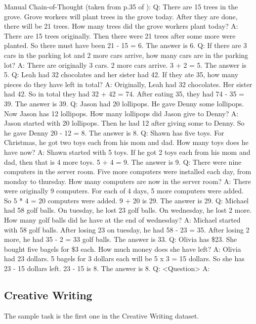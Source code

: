 \documentclass[11pt]{article}
\begin{document}
Manual Chain-of-Thought (taken from p.35 of \citealp{wei_chain--thought_nodate}):
Q: There are 15 trees in the grove. Grove workers will plant trees in the grove today. After they are done, there
will be 21 trees. How many trees did the grove workers plant today?
A: There are 15 trees originally. Then there were 21 trees after some more were planted. So there must have
been 21 - 15 = 6. The answer is 6.
Q: If there are 3 cars in the parking lot and 2 more cars arrive, how many cars are in the parking lot?
A: There are originally 3 cars. 2 more cars arrive. 3 + 2 = 5. The answer is 5.
Q: Leah had 32 chocolates and her sister had 42. If they ate 35, how many pieces do they have left in total?
A: Originally, Leah had 32 chocolates. Her sister had 42. So in total they had 32 + 42 = 74. After eating 35, they
had 74 - 35 = 39. The answer is 39.
Q: Jason had 20 lollipops. He gave Denny some lollipops. Now Jason has 12 lollipops. How many lollipops did
Jason give to Denny?
A: Jason started with 20 lollipops. Then he had 12 after giving some to Denny. So he gave Denny 20 - 12 = 8.
The answer is 8.
Q: Shawn has five toys. For Christmas, he got two toys each from his mom and dad. How many toys does he
have now?
A: Shawn started with 5 toys. If he got 2 toys each from his mom and dad, then that is 4 more toys. 5 + 4 = 9.
The answer is 9.
Q: There were nine computers in the server room. Five more computers were installed each day, from monday
to thursday. How many computers are now in the server room?
A: There were originally 9 computers. For each of 4 days, 5 more computers were added. So 5 * 4 = 20
computers were added. 9 + 20 is 29. The answer is 29.
Q: Michael had 58 golf balls. On tuesday, he lost 23 golf balls. On wednesday, he lost 2 more. How many golf
balls did he have at the end of wednesday?
A: Michael started with 58 golf balls. After losing 23 on tuesday, he had 58 - 23 = 35. After losing 2 more, he
had 35 - 2 = 33 golf balls. The answer is 33.
Q: Olivia has \$23. She bought five bagels for \$3 each. How much money does she have left?
A: Olivia had 23 dollars. 5 bagels for 3 dollars each will be 5 x 3 = 15 dollars. So she has 23 - 15 dollars left. 23
- 15 is 8. The answer is 8.
Q: <Question>
A:

\subsection{Creative Writing}

The sample task is the first one in the Creative Writing dataset. \cite{yao_tree_2023}
\end{document}
